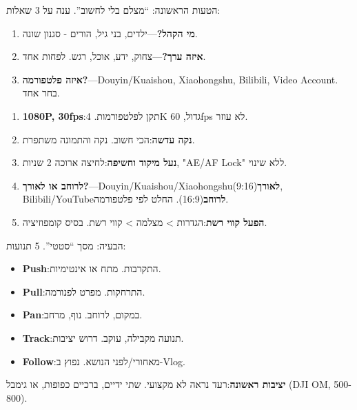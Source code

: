 


הטעות הראשונה: “מצלם בלי לחשוב”. ענה על 3 שאלות:

\begin{enumerate}
  \item \textbf{מי הקהל?}—ילדים, בני גיל, הורים - סגנון שונה.
  \item \textbf{איזה ערך?}—צחוק, ידע, אוכל, רגש. לפחות אחד.
  \item \textbf{איזה פלטפורמה?}—Douyin/Kuaishou, Xiaohongshu, Bilibili, Video Account. בחר אחד.
\end{enumerate}


\begin{enumerate}
  \item \textbf{1080P, 30fps}:תקן לפלטפורמות. 4K גדול, 60fps לא עוזר.
  \item \textbf{נקה עדשה}:הכי חשוב. נקה והתמונה משתפרת.
  \item \textbf{נעל מיקוד וחשיפה}:לחיצה ארוכה 2 שניות, "AE/AF Lock" ללא שינוי.
  \item \textbf{לרוחב או לאורך?}—Douyin/Kuaishou/Xiaohongshu\textbf{לאורך}(9:16), Bilibili/YouTube\textbf{לרוחב}(16:9). החלט לפי פלטפורמה.
  \item \textbf{הפעל קווי רשת}:הגדרות > מצלמה > קווי רשת. בסיס קומפוזיציה.
\end{enumerate}


הבעיה: מסך “סטטי”. 5 תנועות:

\begin{itemize}
  \item \textbf{Push}:התקרבות. מתח או אינטימיות.
  \item \textbf{Pull}:התרחקות. מפרט לפנורמה.
  \item \textbf{Pan}:במקום, לרוחב. נוף, מרחב.
  \item \textbf{Track}:תנועה מקבילה, עוקב. דרוש יציבות.
  \item \textbf{Follow}:מאחורי/לפני הנושא. נפוץ ב-Vlog.
\end{itemize}

\textbf{יציבות ראשונה}:רעד נראה לא מקצועי. שתי ידיים, ברכיים כפופות, או גימבל (DJI OM, 500-800).

